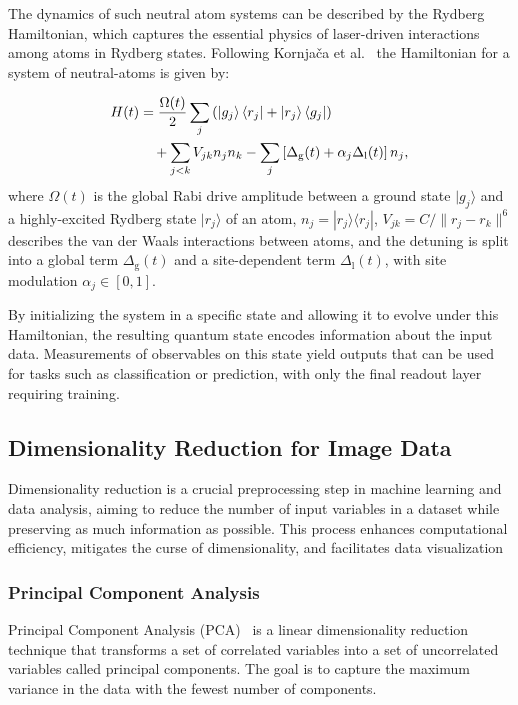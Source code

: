 \documentclass[conference]{IEEEtran}
\begin{document}
The dynamics of such neutral atom systems can be described by the Rydberg Hamiltonian, which captures 
the essential physics of laser-driven interactions among atoms in Rydberg states. Following Kornjača et al.~\cite{kornjavcaLargescaleQuantumReservoir2024} the Hamiltonian for a system of neutral-atoms is given by:

\begin{equation}
    \begin{aligned}
        H(t) &= \dfrac{\Omega(t)}{2}\sum_j \left(\ket{g_j}\bra{r_j}+\ket{r_j}\bra{g_j}\right) \\
             &{{\quad}} + \sum_{j<k}V_{jk}n_jn_k - \sum_j \left[\Delta_{\mathrm{g}}(t) + \alpha_j\Delta_{\mathrm{l}}(t)\right] n_j,
    \end{aligned}
    \label{eq:rydberg_hamiltonian}
\end{equation}
where \( \Omega(t) \) is the global Rabi drive amplitude between a 
ground state \( |g_j\rangle \) and a highly-excited Rydberg state 
\( |r_j\rangle \) of an atom,
\( n_j = |r_j\rangle \langle r_j| \), 
\( V_{jk} = C/\|r_j - r_k\|^6 \) describes the van der Waals interactions
between atoms, and the detuning is split into a global term 
\( \Delta_{\mathrm{g}}(t) \)
and a site-dependent term \( \Delta_{\mathrm{l}}(t) \), with site 
modulation \( \alpha_j \in [0, 1] \).

By initializing the system in a specific state and allowing 
it to evolve under this Hamiltonian, the resulting quantum 
state encodes information about the input data. Measurements 
of observables on this state yield outputs that can be used 
for tasks such as classification or prediction, with only the 
final readout layer requiring training.


\subsection{Dimensionality Reduction for Image Data}
Dimensionality reduction is a crucial preprocessing step in 
machine learning and data analysis, aiming to reduce the 
number of input variables in a dataset while preserving as 
much information as possible. This process enhances 
computational efficiency, mitigates the curse of 
dimensionality, and facilitates data visualization


\subsubsection{Principal Component Analysis}
Principal Component Analysis (PCA)~\cite{shlensTutorialPrincipalComponent2014} is a linear dimensionality 
reduction technique that transforms a set of correlated 
variables into a set of uncorrelated variables called 
principal components. The goal is to capture the maximum 
variance in the data with the fewest number of components.
\end{document}
